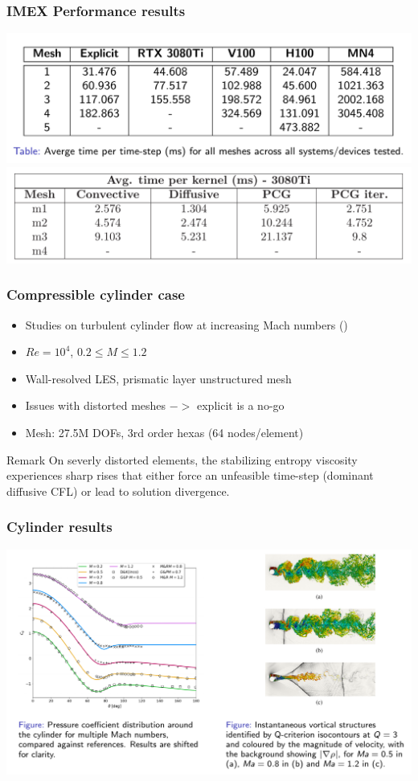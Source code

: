 \begin{frame}
    \frametitle{IMEX Performance results}
    \includegraphics[width=1.0\textwidth]{images/tgv_timings.png}
    \includegraphics[width=1.0\textwidth]{images/tgv_kernels.png}
\end{frame}

\begin{frame}
    \frametitle{Compressible cylinder case}
    \begin{itemize}
      \item Studies on turbulent cylinder flow at increasing Mach numbers (\cite{bib:etmm14})
      \item $Re = 10^4$, $0.2 \leq M \leq 1.2$
      \item Wall-resolved LES, prismatic layer unstructured mesh
      \item Issues with distorted meshes $->$ explicit is a no-go
      \item Mesh: 27.5M DOFs, 3rd order hexas (64 nodes/element)
    \end{itemize}
    \begin{block}{Remark}
    On severly distorted elements, the stabilizing entropy viscosity experiences sharp rises that either force an unfeasible time-step (dominant diffusive CFL) or lead to solution divergence.
    \end{block}
\end{frame}
    
    \begin{frame}
    \frametitle{Cylinder results}
    
    \includegraphics[width=1.0\textwidth]{images/cylinder_results.png}
    \end{frame}
    
